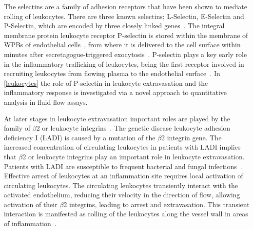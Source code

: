 The selectins are a family of adhesion receptors that have been shown to mediate rolling of leukocytes. There are three known selectins; L-Selectin, E-Selectin and P-Selectin, which are encoded by three closely linked genes~\cite{Watson1990}. The integral membrane protein leukocyte receptor P-selectin is stored within the membrane of WPBs of endothelial cells~\cite{Bonfanti1989, McEver1989}, from where it is delivered to the cell surface within minutes after secretagogue-triggered exocytosis~\cite{McEver2002}. P-selectin plays a key early role in the inflammatory trafficking of leukocytes, being the first receptor involved in recruiting leukocytes from flowing plasma to the endothelial surface~\cite{Larsen1989}. In \autoref{leukocytes} the role of P-selectin in leukocyte extravasation and the inflammatory response is investigated via a novel approach to quantitative analysis in fluid flow assays.

At later stages in leukocyte extravasation important roles are played by the family of $\beta$2 or leukocyte integrins~\cite{Springer1990, Mayadas1993}. The genetic disease leukocyte adhesion deficiency I (LADI) is caused by a mutation of the $\beta$2 integrin gene. The increased concentration of circulating leukocytes in patients with LADI implies that $\beta$2 or leukocyte integrins play an important role in leukocyte extravasation. Patients with LADI are susceptible to frequent bacterial and fungal infections~\cite{Anderson1987}. Effective arrest of leukocytes at an inflammation site requires local activation of circulating leukocytes. The circulating leukocytes transiently interact with the activated endothelium, reducing their velocity in the direction of flow, allowing activation of their $\beta$2 integrins, leading to arrest and extravasation. This transient interaction is manifested as rolling of the leukocytes along the vessel wall in areas of inflammation~\cite{Mayadas1993, Atherton1972}.

